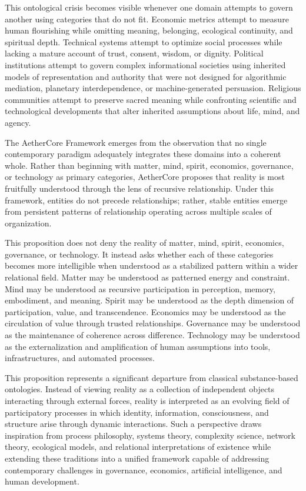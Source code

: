 \documentclass[12pt]{article}
\begin{document}
This ontological crisis becomes visible whenever one domain attempts to govern another using categories that do not fit. Economic metrics attempt to measure human flourishing while omitting meaning, belonging, ecological continuity, and spiritual depth. Technical systems attempt to optimize social processes while lacking a mature account of trust, consent, wisdom, or dignity. Political institutions attempt to govern complex informational societies using inherited models of representation and authority that were not designed for algorithmic mediation, planetary interdependence, or machine-generated persuasion. Religious communities attempt to preserve sacred meaning while confronting scientific and technological developments that alter inherited assumptions about life, mind, and agency.

The AetherCore Framework emerges from the observation that no single contemporary paradigm adequately integrates these domains into a coherent whole. Rather than beginning with matter, mind, spirit, economics, governance, or technology as primary categories, AetherCore proposes that reality is most fruitfully understood through the lens of recursive relationship. Under this framework, entities do not precede relationships; rather, stable entities emerge from persistent patterns of relationship operating across multiple scales of organization.

This proposition does not deny the reality of matter, mind, spirit, economics, governance, or technology. It instead asks whether each of these categories becomes more intelligible when understood as a stabilized pattern within a wider relational field. Matter may be understood as patterned energy and constraint. Mind may be understood as recursive participation in perception, memory, embodiment, and meaning. Spirit may be understood as the depth dimension of participation, value, and transcendence. Economics may be understood as the circulation of value through trusted relationships. Governance may be understood as the maintenance of coherence across difference. Technology may be understood as the externalization and amplification of human assumptions into tools, infrastructures, and automated processes.

This proposition represents a significant departure from classical substance-based ontologies. Instead of viewing reality as a collection of independent objects interacting through external forces, reality is interpreted as an evolving field of participatory processes in which identity, information, consciousness, and structure arise through dynamic interactions. Such a perspective draws inspiration from process philosophy, systems theory, complexity science, network theory, ecological models, and relational interpretations of existence while extending these traditions into a unified framework capable of addressing contemporary challenges in governance, economics, artificial intelligence, and human development.
\end{document}
